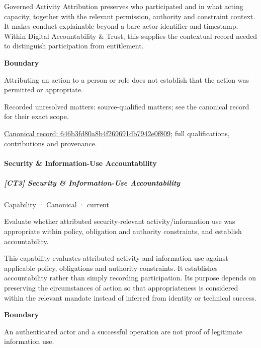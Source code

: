 Governed Activity Attribution preserves who participated and in what acting capacity, together with the relevant permission, authority and constraint context. It makes conduct explainable beyond a bare actor identifier and timestamp. Within Digital Accountability \& Trust, this supplies the contextual record needed to distinguish participation from entitlement.



\textbf{Boundary}



Attributing an action to a person or role does not establish that the action was permitted or appropriate.


{\small Recorded unresolved matters: source-qualified matters; see the canonical record for their exact scope.}\par
{\footnotesize \href{../../../../continuum/strategy/capability/646b3fd80a8b4f269691db7942e0f809.md}{Canonical record: 646b3fd80a8b4f269691db7942e0f809}; full qualifications, contributions and provenance.}\par
\paragraph{Security \& Information-Use Accountability}

\subparagraph{[CT3] Security \& Information-Use Accountability}

\label{element:a33d0cc14c384bd48012def4ded54a67}
{\small Capability · Canonical · current}\par

Evaluate whether attributed security-relevant activity/information use was appropriate within policy, obligation and authority constraints, and establish accountability.



This capability evaluates attributed activity and information use against applicable policy, obligations and authority constraints. It establishes accountability rather than simply recording participation. Its purpose depends on preserving the circumstances of action so that appropriateness is considered within the relevant mandate instead of inferred from identity or technical success.



\textbf{Boundary}



An authenticated actor and a successful operation are not proof of legitimate information use.


